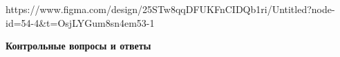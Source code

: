 \noindent
\begin{minipage}{\linewidth}
\end{minipage}
\bigskip

\noindent
\begin{minipage}{\linewidth}
\end{minipage}
\bigskip

https://www.figma.com/design/25STw8qqDFUKFnCIDQb1ri/Untitled?node-id=54-4&t=OsjLYGum8sn4em53-1

\textbf{Контрольные вопросы и ответы}

